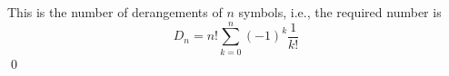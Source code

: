 This is the number of derangements of $n$ symbols, i.e., the required
number is
\[
D_n = n! \sum_{k=0}^n (-1)^k\frac{1}{k!}
\]
\qed
